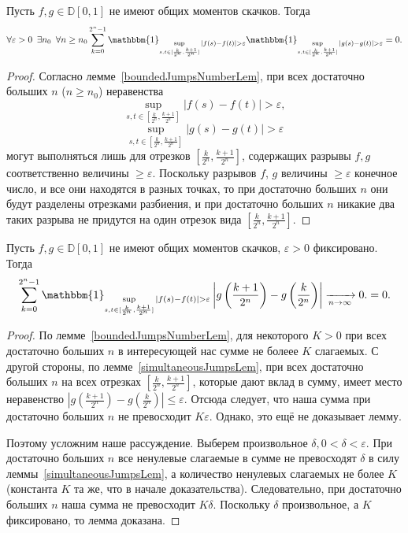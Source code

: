 \documentclass[12pt, a4paper, titlepage]{article}
\begin{document}
\begin{lem}\label{simultaneousJumpsLem}
 Пусть $f, g \in \mathbb{D}[0,1]$ не имеют общих моментов скачков. Тогда
 $$\forall \varepsilon>0 \enskip \exists n_0 \enskip \forall n\ge n_0
 \sum\limits_{k=0}^{2^n-1}
 \mathbbm{1}_{\sup\limits_{s,t \in [\frac{k}{2^n}, \frac{k+1}{2^n}]}|f(s)-f(t)|>\varepsilon}
 \mathbbm{1}_{\sup\limits_{s,t \in [\frac{k}{2^n}, \frac{k+1}{2^n}]}|g(s)-g(t)|>\varepsilon}
 =0.
 $$
 \end{lem}
 \begin{proof}
  Согласно лемме~\ref{boundedJumpsNumberLem}, при всех достаточно больших $n$ ($n \ge n_0$)
 неравенства
  $$\sup\limits_{s,t \in [\frac{k}{2^n}, \frac{k+1}{2^n}]}|f(s)-f(t)|>\varepsilon,$$
  $$\sup\limits_{s,t \in [\frac{k}{2^n}, \frac{k+1}{2^n}]}|g(s)-g(t)|>\varepsilon$$
  могут выполняться лишь для отрезков $[\frac{k}{2^n}, \frac{k+1}{2^n}]$,
  содержащих разрывы $f, g$ соответственно величины $\ge \varepsilon.$
  Поскольку разрывов $f$, $g$ величины $\ge \varepsilon$ конечное число, и все они находятся в разных
  точках, то при достаточно больших $n$ они будут разделены отрезками разбиения, и при достаточно больших $n$
  никакие два таких разрыва не придутся на один отрезок вида 
  $[\frac{k}{2^n}, \frac{k+1}{2^n}]$.
 \end{proof}
 
 \begin{lem}\label{sumOverJumpsLem}
  Пусть $f, g \in \mathbb{D}[0,1]$ не имеют общих моментов скачков, $\varepsilon>0$
  фиксировано. Тогда
 $$\sum\limits_{k=0}^{2^n-1}
 \mathbbm{1}_{\sup\limits_{s,t \in [\frac{k}{2^n}, \frac{k+1}{2^n}]}|f(s)-f(t)|>\varepsilon}
 \left|g\left(\frac{k+1}{2^n}\right)-g\left(\frac{k}{2^n}\right)\right|\xrightarrow[n\to\infty]{}0.
 =0.
 $$
 \end{lem}
 \begin{proof}
  По лемме~\ref{boundedJumpsNumberLem}, для некоторого $K > 0$ при всех достаточно больших $n$
 в интересующей нас сумме не болеее $K$ слагаемых. 
 С другой стороны, по лемме~\ref{simultaneousJumpsLem}, при всех достаточно больших $n$
 на всех отрезках $[\frac{k}{2^n}, \frac{k+1}{2^n}]$, которые дают вклад в сумму, 
 имеет место неравенство 
 $\left|g\left(\frac{k+1}{2^n}\right)-g\left(\frac{k}{2^n}\right)\right| \le \varepsilon.$
 Отсюда следует, что наша сумма при достаточно больших $n$ не превосходит $K\varepsilon.$
 Однако, это ещё не доказывает лемму. 
 
 Поэтому усложним наше рассуждение. Выберем произвольное $\delta, 0 < \delta < \varepsilon.$
 При достаточно больших $n$ все ненулевые слагаемые в сумме не превосходят $\delta$
 в силу леммы~\ref{simultaneousJumpsLem}, а количество ненулевых слагаемых не более $K$ (константа 
 $K$ та же, что в начале доказательства).
 Следовательно, при достаточно больших $n$ наша сумма не превосходит $K\delta.$
 Поскольку $\delta$ произвольное, а $K$ фиксировано, то лемма доказана. 
 \end{proof}
\end{document}

